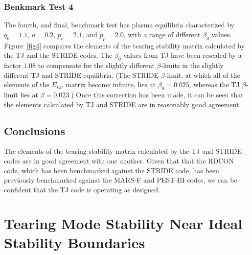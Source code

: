 \documentclass[12pt,prb,aps]{revtex4-1}
\begin{document}
\subsubsection{Benkmark Test 4}
The fourth, and final,  benchmark test has plasma equilibria characterized by $q_0=1.1$, $a=0.2$, $p_\sigma = 2.1$, and $p_p=2.0$, with a range of different $\beta_0$ values.  
Figure~\ref{fig4} compares the elements of the tearing stability matrix calculated by the TJ and the STRIDE codes. The $\beta_0$ values from TJ have been rescaled
by a factor $1.08$ to compensate for the slightly different $\beta$-limits in the slightly different TJ and STRIDE equilibria. (The STRIDE $\beta$-limit, at which all of the
elements of the $E_{kk'}$ matrix become infinite,  lies at
$\beta_0=0.025$, whereas the TJ $\beta$-limit lies at $\beta=0.023$.)
 Once this correction has been made, it can be seen that the elements calculated by
TJ and STRIDE are in reasonably good agreement.  

\subsection{Conclusions}
The elements of the tearing stability matrix calculated by the TJ and STRIDE codes are in good agreement with one another. Given that that the RDCON code,
which has been benchmarked against the STRIDE code, has been previously benchmarked against the MARS-F and PEST-III codes,\cite{am2,aglas2} we can be confident  that the TJ code is operating as designed. 

\section{Tearing Mode Stability Near Ideal Stability Boundaries}\label{invest}
\end{document}
